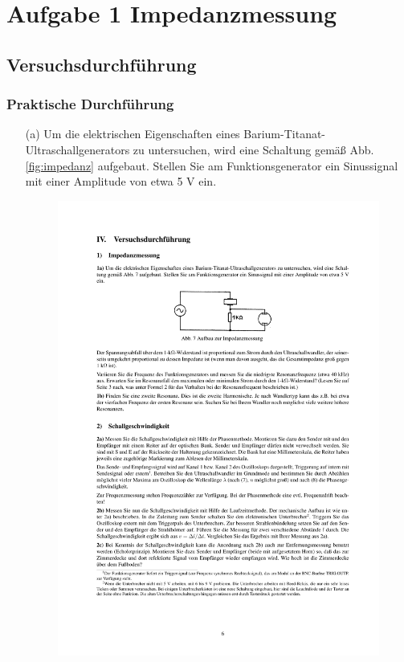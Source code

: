 \documentclass[12pt]{scrartcl}
\begin{document}
\section{Aufgabe 1 Impedanzmessung}
\subsection{Versuchsdurchführung}
\subsubsection{Praktische Durchführung}
\begin{itemize}
\item[(a)]
Um die elektrischen Eigenschaften eines Barium-Titanat-Ultraschallgenerators zu untersuchen, wird eine Schaltung gemäß Abb. \ref{fig:impedanz}
aufgebaut. Stellen Sie am Funktionsgenerator ein Sinussignal mit einer Amplitude von etwa 5 V ein.
\begin{figure}[htbp] 
  \centering
    \includegraphics[trim = 20mm 210mm 20mm 55mm, clip, scale = 1]{impedanz.pdf}

\end{figure}
\end{itemize}
\end{document}

